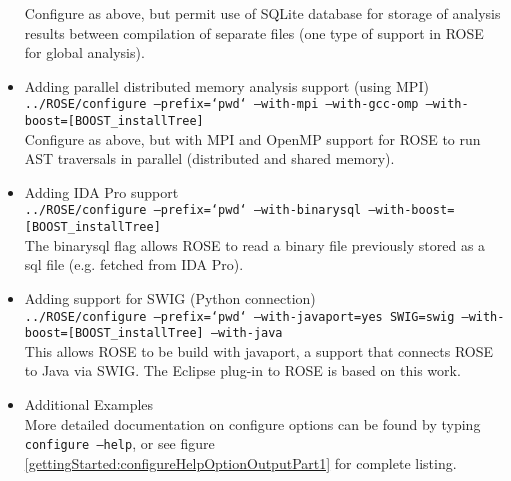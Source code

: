 \begin{itemize}
         Configure as above, but permit use of SQLite database for storage of analysis
         results between compilation of separate files (one type of support in ROSE for
         global analysis).
   \item Adding parallel distributed memory analysis support (using MPI) \\
         {\tt ../ROSE/configure --prefix=`pwd` --with-mpi --with-gcc-omp --with-boost=[BOOST\_installTree]} \\
         Configure as above, but with MPI and OpenMP support for ROSE to run AST traversals
         in parallel (distributed and shared memory).
   \item Adding IDA Pro support \\
         {\tt ../ROSE/configure --prefix=`pwd` --with-binarysql --with-boost=[BOOST\_installTree]} \\
         The binarysql flag allows ROSE to read a binary file previously stored as a sql file (e.g. fetched from
         IDA Pro). 
   \item Adding support for SWIG (Python connection) \\
         {\tt ../ROSE/configure --prefix=`pwd` --with-javaport=yes SWIG=swig --with-boost=[BOOST\_installTree] --with-java} \\
         This allows ROSE to be build with javaport, a support that connects ROSE to Java via SWIG.
         The Eclipse plug-in to ROSE is based on this work.
   \item Additional Examples \\ 
         More detailed documentation on configure options can be found by typing 
         {\tt configure --help}, or see figure
         \ref{gettingStarted:configureHelpOptionOutputPart1} for complete
         listing.
\end{itemize}




